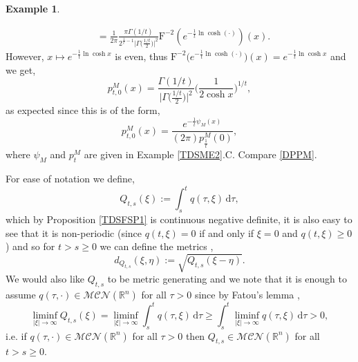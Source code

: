 \documentclass[a4paper, 12pt]{report}
\theoremstyle{cor}
\theoremstyle{remark}
\theoremstyle{definition}
\newtheorem{eg}[theorem]{Example}
\begin{document}
\begin{eg}
\begin{itemize}
$$\begin{aligned}
& = \frac{1}{2\pi}\frac{\pi\Gamma(1/t)}{2^{\frac{1}{t} - 1}\big|\Gamma\big(\frac{1/t}{2}\big)\big|^2}\mathrm{F}^{-2}\left(e^{-\frac{1}{t}\ln\cosh(\cdot)}\right)(x).
\end{aligned}
$$
However, $x \mapsto e^{-\frac{1}{t}\ln\cosh x}$ is even, thus $\mathrm{F}^{-2}\big(e^{-\frac{1}{t}\ln\cosh(\cdot)}\big)(x) = e^{-\frac{1}{t}\ln\cosh x}$ and we get,
$$
p_{t, 0}^M(x) = \frac{\Gamma(1/t)}{\big|\Gamma\big(\frac{1/t}{2}\big)\big|^2}\bigg(\frac{1}{2\cosh x}\bigg)^{1/t},
$$
as expected since this is of the form,
$$
p_{t, 0}^M(x) = \frac{e^{-\frac{1}{t}\psi_M(x)}}{(2\pi)p_\frac{1}{t}^M(0)},
$$
where $\psi_M$ and $p_t^M$ are given in Example \ref{TDSME2}.C.  Compare \eqref{DPPM}.
\end{itemize}
\end{eg}
For ease of notation we define,
\begin{equation}
Q_{t, s}(\xi) := \int_s^t q(\tau, \xi)\,\mathrm{d}\tau,\label{Q}
\end{equation}
which by Proposition \ref{TDSFSP1} is continuous negative definite, it is also easy to see that it is non-periodic (since $q(t, \xi) = 0$ if and only if $\xi = 0$ and $q(t, \xi) \ge 0$) and so for $t > s \ge 0$ we can define the metrics \cite{Paper},
\begin{equation}
d_{Q_{t, s}}(\xi, \eta) := \sqrt{Q_{t, s}(\xi - \eta)}\label{M}.
\end{equation}
We would also like $Q_{t, s}$ to be metric generating and we note that it is enough to assume $q(\tau, \cdot) \in \mathcal{MCN}(\mathbb{R}^n)$ for all $\tau > 0$ since by Fatou's lemma \cite[Theorem 9.11]{FubiniBook},
$$
\liminf_{|\xi| \to \infty} Q_{t, s}(\xi) = \liminf_{|\xi| \to \infty}\int_s^tq(\tau, \xi)\,\mathrm{d}\tau \ge \int_s^t\liminf_{|\xi| \to \infty} q(\tau, \xi)\,\mathrm{d}\tau > 0,
$$
i.e. if $q(\tau, \cdot) \in \mathcal{MCN}(\mathbb{R}^n)$ for all $\tau > 0$ then $Q_{t, s} \in \mathcal{MCN}(\mathbb{R}^n)$ for all $t > s \ge 0$.
\end{document}
